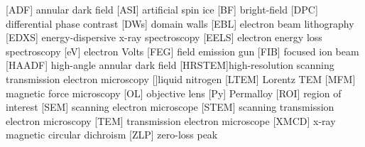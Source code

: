 
    [ADF]   {annular dark field}
    [ASI]   {artificial spin ice}
     [BF]    {bright-field}
    [DPC]   {differential phase contrast}
     [DWs]   {domain walls}
    [EBL]   {electron beam lithography}
   [EDXS]  {energy-dispersive x-ray spectroscopy}
   [EELS]  {electron energy loss spectroscopy}
     [eV]    {electron Volts}
    [FEG]   {field emission gun}
    [FIB]   {focused ion beam}
  [HAADF] {high-angle annular dark field}
 [HRSTEM]{high-resolution scanning transmission electron microscopy}
    []{liquid nitrogen}
   [LTEM]  {Lorentz TEM}
    [MFM]   {magnetic force microscopy}
     [OL]    {objective lens}
     [Py]    {Permalloy}
    [ROI]   {region of interest}
    [SEM]   {scanning electron microscope}
   [STEM]  {scanning transmission electron microscopy}
    [TEM]   {transmission electron microscope}
   [XMCD]  {x-ray magnetic circular dichroism}
    [ZLP]   {zero-loss peak}